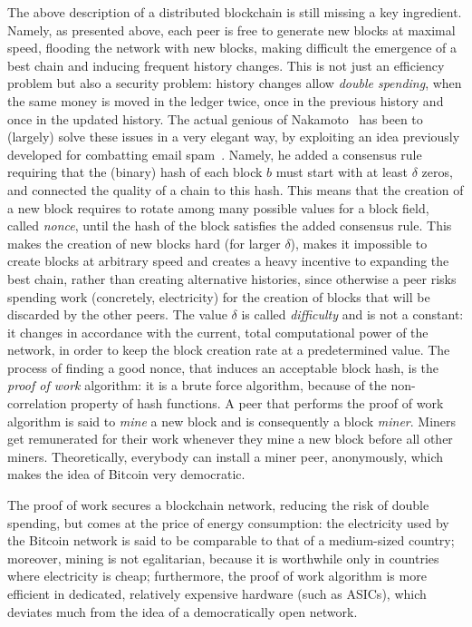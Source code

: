 The above description of a distributed blockchain is still missing a key ingredient. Namely,
as presented above, each peer is free to generate new blocks at maximal speed, flooding the network
with new blocks, making difficult the emergence of a best chain and inducing frequent history changes.
This is not just an efficiency problem but also a security problem: history changes allow
\emph{double spending}, when the same money is moved in the ledger twice, once in the previous history
and once in the updated history. The actual genious of Nakamoto~\cite{Nakamoto08} has been to (largely)
solve these issues in a very elegant way, by exploiting an idea previously developed for combatting
email spam~\cite{DworkN92}. Namely, he added a consensus rule requiring that the (binary)
hash of each block $b$ must start with at least $\delta$ zeros, and connected the quality of a chain
to this hash. This means that the creation of a new block requires to rotate among
many possible values for a block field, called \emph{nonce}, until the hash of the block satisfies the
added consensus rule. This makes the creation of new blocks hard
(for larger $\delta$), makes it impossible to create blocks at arbitrary speed and creates a heavy
incentive to expanding the best chain, rather than creating alternative histories, since otherwise a peer
risks spending work (concretely, electricity) for the creation of blocks that will be discarded by the other peers.
The value $\delta$ is called \emph{difficulty} and is not a constant: it changes in accordance with
the current, total computational power of the network, in order to keep the block creation rate at a predetermined value.
The process of finding a good nonce, that induces an
acceptable block hash, is the \emph{proof of work} algorithm: it is a brute force algorithm, because of the non-correlation
property of hash functions. A peer that performs the proof of work algorithm is said to \emph{mine}
a new block and is consequently a block \emph{miner}. Miners get remunerated for their work whenever
they mine a new block before all other miners. Theoretically, everybody can install a miner peer,
anonymously, which makes the idea of Bitcoin very democratic.

The proof of work secures a blockchain network, reducing the risk of double spending,
but comes at the price of energy consumption: the electricity used by the Bitcoin network is said
to be comparable to that of a medium-sized country; moreover, mining is not egalitarian, because
it is worthwhile only in countries where electricity is cheap; furthermore, the proof of work algorithm
is more efficient in dedicated, relatively expensive hardware (such as ASICs),
which deviates much from the idea of a democratically open network.

